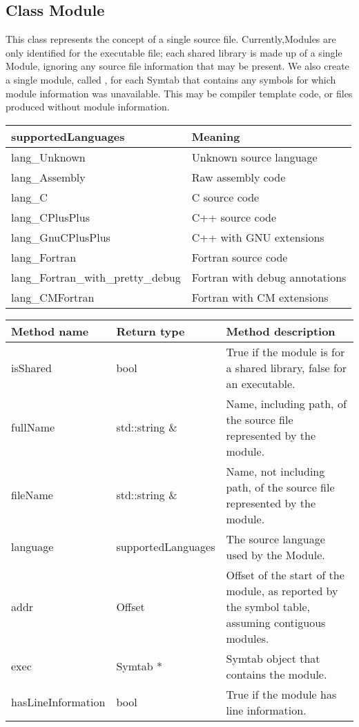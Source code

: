 \subsection{Class Module}\label{Module}
This class represents the concept of a single source file. Currently,Modules are only identified for the executable file; each shared library is made up of a single Module, ignoring any source file information that may be present. We also create a single module, called , for each Symtab that contains any symbols for which module information was unavailable. This may be compiler template code, or files produced without module information. 

\begin{center}
\begin{tabular}{ll}
\toprule
supportedLanguages & Meaning \\
\midrule
lang\_Unknown & Unknown source language \\
lang\_Assembly & Raw assembly code \\
lang\_C & C source code \\
lang\_CPlusPlus & C++ source code \\
lang\_GnuCPlusPlus & C++ with GNU extensions \\
lang\_Fortran & Fortran source code \\
lang\_Fortran\_with\_pretty\_debug & Fortran with debug annotations \\
lang\_CMFortran & Fortran with CM extensions \\
\bottomrule
\end{tabular}
\end{center}

\begin{tabular}{p{1.25in}p{1.25in}p{3in}}
	Method name & Return type & Method description \\
	\hline
	isShared & bool & True if the module is for a shared library, false for an executable. \\
	fullName & std::string \& & Name, including path, of the source file represented by the module. \\
	fileName & std::string \& & Name, not including path, of the source file represented by the module. \\
	language & supportedLanguages & The source language used by the Module. \\
	addr & Offset & Offset of the start of the module, as reported by the symbol table, assuming contiguous modules. \\
	exec & Symtab * & Symtab object that contains the module. \\
	hasLineInformation & bool & True if the module has line information. \\
\end{tabular}


